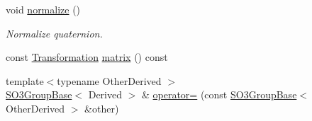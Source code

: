 \begin{DoxyCompactItemize}
void \hyperlink{class_sophus_1_1_s_o3_group_base_a10c6863560f5bac15d13d1916c3cda95}{normalize} ()
\begin{DoxyCompactList}\small\item\em Normalize quaternion. \end{DoxyCompactList}\item 
const \hyperlink{class_sophus_1_1_s_o3_group_base_aa20fc57bf1b355a6616f5c4b785f1fc5}{Transformation} \hyperlink{class_sophus_1_1_s_o3_group_base_adc29d15481f673ccfcae77b065ea38be}{matrix} () const 
\item 
{\footnotesize template$<$typename Other\+Derived $>$ }\\\hyperlink{class_sophus_1_1_s_o3_group_base}{S\+O3\+Group\+Base}$<$ Derived $>$ \& \hyperlink{class_sophus_1_1_s_o3_group_base_a041893de9d3e7ddb5c0bd12add57319b}{operator=} (const \hyperlink{class_sophus_1_1_s_o3_group_base}{S\+O3\+Group\+Base}$<$ Other\+Derived $>$ \&other)\hypertarget{class_sophus_1_1_s_o3_group_base_a041893de9d3e7ddb5c0bd12add57319b}{}\label{class_sophus_1_1_s_o3_group_base_a041893de9d3e7ddb5c0bd12add57319b}


\end{DoxyCompactItemize}

